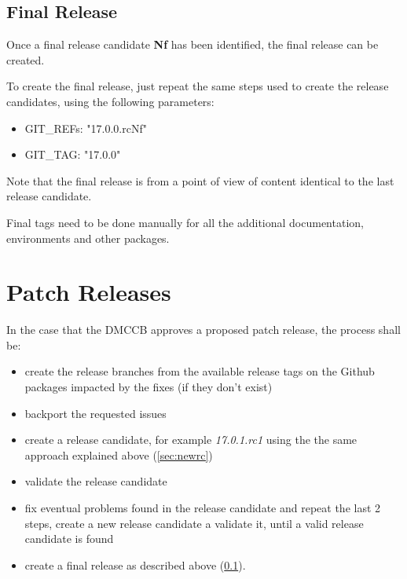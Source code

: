 \subsection{Final Release} \label{sec:finalrelease}

Once a final release candidate \textbf{Nf} has been identified, the final release can be created.

To create the final release, just repeat the same steps used to create the release candidates, using the following parameters:

\begin{itemize}
\item GIT\_REFs: "17.0.0.rcNf"
\item GIT\_TAG: "17.0.0"
\end{itemize}

Note that the final release is from a point of view of content identical to the last release candidate.

Final tags need to be done manually for all the additional documentation, environments and other packages.

\newpage

\section{Patch Releases} \label{sec:patchreleases}

In the case that the DMCCB approves a proposed patch release, the process shall be:

\begin{itemize}
\item create the release branches from the available release tags on the Github packages impacted by the fixes (if they don't exist)
\item backport the requested issues
\item create a release candidate, for example \textit{17.0.1.rc1} using the the same approach explained above (\ref{sec:newrc})
\item validate the release candidate
\item fix eventual problems found in the release candidate and repeat the last 2 steps, create a new release candidate a validate it, until a valid release candidate is found
\item create a final release as described above (\ref{sec:finalrelease}).
\end{itemize}


